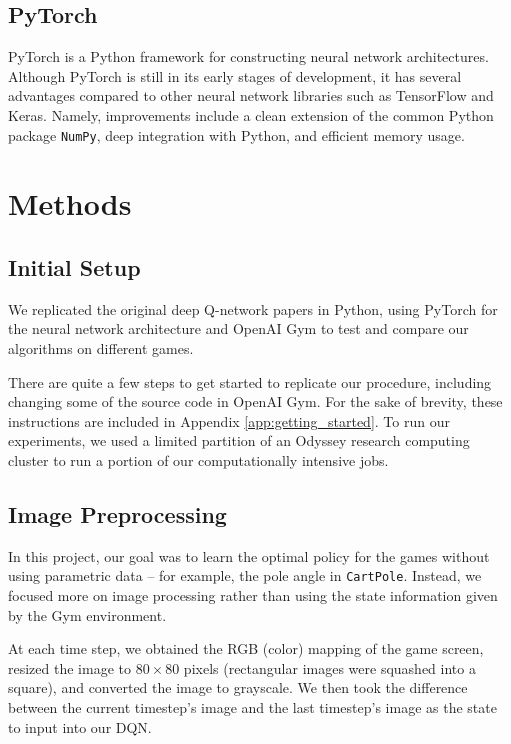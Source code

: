 \documentclass[11pt]{article}
\newcommand{\cp}{\texttt{CartPole}}
\begin{document}
\subsection{PyTorch}

PyTorch \cite{paszke2017pytorch} is a Python framework for constructing neural network architectures. Although PyTorch is still in its early stages of development, it has several advantages compared to other neural network libraries such as TensorFlow and Keras. Namely, improvements include a clean extension of the common Python package \texttt{NumPy}, deep integration with Python, and efficient memory usage. 

\section{Methods}

\subsection{Initial Setup}

We replicated the original deep Q-network papers \cite{mnih2013playing, mnih2015human} in Python, using PyTorch \cite{paszke2017pytorch} for the neural network architecture and OpenAI Gym \cite{brockman2016openai} to test and compare our algorithms on different games. 

There are quite a few steps to get started to replicate our procedure, including changing some of the source code in OpenAI Gym. For the sake of brevity, these instructions are included in Appendix \ref{app:getting_started}. To run our experiments, we used a limited partition of an Odyssey research computing cluster to run a portion of our computationally intensive jobs.

\subsection{Image Preprocessing}

In this project, our goal was to learn the optimal policy for the games without using parametric data -- for example, the pole angle in \cp. Instead, we focused more on image processing rather than using the state information given by the Gym environment.

At each time step, we obtained the RGB (color) mapping of the game screen, resized the image to $80 \times 80$ pixels (rectangular images were squashed into a square), and converted the image to grayscale. We then took the difference between the current timestep's image and the last timestep's image as the state to input into our DQN. 
\end{document}
